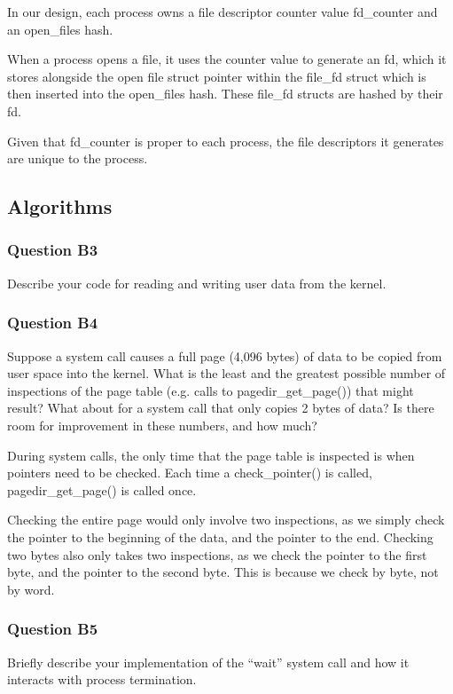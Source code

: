 In our design, each process owns a file descriptor counter value fd\_counter and an open\_files hash.

When a process opens a file, it uses the counter value to generate an fd, which it stores alongside the open file struct pointer within the file\_fd struct which is then inserted into the open\_files hash. These file\_fd structs are hashed by their fd.

Given that fd\_counter is proper to each process, the file descriptors it generates are unique to the process.

\subsection{Algorithms}
\subsubsection*{Question B3} %
Describe your code for reading and writing user data from the kernel.

\subsubsection*{Question B4} %
Suppose a system call causes a full page (4,096 bytes) of data to be copied from user space into the kernel.  What is the least and the greatest possible number of inspections of the page table (e.g. calls to pagedir\_get\_page()) that might result?  What about for a system call that only copies 2 bytes of data?  Is there room for improvement in these numbers, and how much?

During system calls, the only time that the page table is inspected is when
pointers need to be checked.  Each time a check\_pointer() is called,
pagedir\_get\_page() is called once.

Checking the entire page would only involve two inspections, as we simply check
the pointer to the beginning of the data, and the pointer to the end.  Checking
two bytes also only takes two inspections, as we check the pointer to the first
byte, and the pointer to the second byte. This is because we check by byte, not
by word.

\subsubsection*{Question B5} %
Briefly describe your implementation of the ``wait'' system call and how it interacts with process termination.


